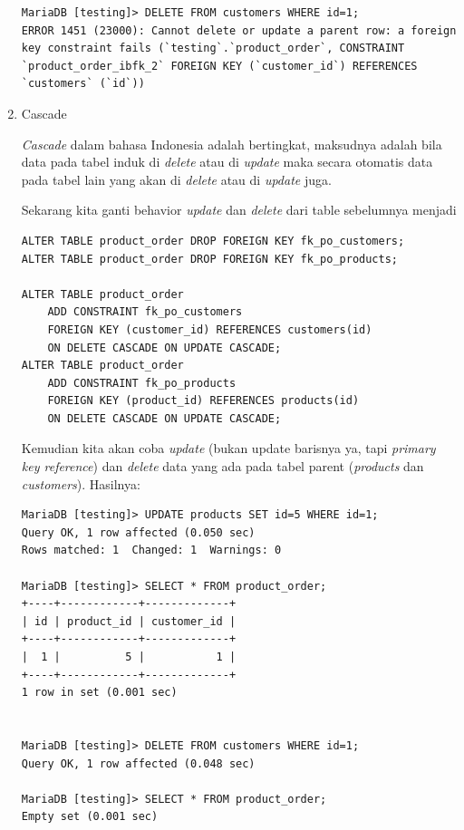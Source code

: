 \documentclass[a4paper]{article}
\newcommand{\code}[1]{\allowbreak{\texttt{#1}}}
\begin{document}
\begin{enumerate}
\begin{lstlisting}
MariaDB [testing]> DELETE FROM customers WHERE id=1;
ERROR 1451 (23000): Cannot delete or update a parent row: a foreign key constraint fails (`testing`.`product_order`, CONSTRAINT `product_order_ibfk_2` FOREIGN KEY (`customer_id`) REFERENCES `customers` (`id`))

\end{lstlisting}

	\item Cascade

\textit{Cascade} dalam bahasa Indonesia adalah bertingkat, maksudnya adalah bila data pada tabel induk di \textit{delete} atau di \textit{update} maka secara otomatis data pada tabel lain yang \code{memiliki relasi} akan di \textit{delete} atau di \textit{update} juga.

Sekarang kita ganti behavior \textit{update} dan \textit{delete} dari table sebelumnya menjadi  \code{Cascade}
\begin{lstlisting}
ALTER TABLE product_order DROP FOREIGN KEY fk_po_customers;
ALTER TABLE product_order DROP FOREIGN KEY fk_po_products;

ALTER TABLE product_order
	ADD CONSTRAINT fk_po_customers 
	FOREIGN KEY (customer_id) REFERENCES customers(id)
	ON DELETE CASCADE ON UPDATE CASCADE;
ALTER TABLE product_order 
	ADD CONSTRAINT fk_po_products
	FOREIGN KEY (product_id) REFERENCES products(id)
	ON DELETE CASCADE ON UPDATE CASCADE;
\end{lstlisting}

Kemudian kita akan coba  \textit{update} (bukan update barisnya ya, tapi \textit{primary key reference}) dan \textit{delete} data yang ada pada tabel parent (\textit{products} dan \textit{customers}). Hasilnya:

\begin{lstlisting}
MariaDB [testing]> UPDATE products SET id=5 WHERE id=1;
Query OK, 1 row affected (0.050 sec)
Rows matched: 1  Changed: 1  Warnings: 0

MariaDB [testing]> SELECT * FROM product_order;
+----+------------+-------------+
| id | product_id | customer_id |
+----+------------+-------------+
|  1 |          5 |           1 |
+----+------------+-------------+
1 row in set (0.001 sec)


MariaDB [testing]> DELETE FROM customers WHERE id=1;
Query OK, 1 row affected (0.048 sec)

MariaDB [testing]> SELECT * FROM product_order;
Empty set (0.001 sec)

\end{lstlisting}


\end{enumerate}
\end{document}
